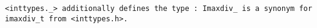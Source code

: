 \tt{<inttypes._>} additionally defines the type :
\tt{Imaxdiv_} is a synonym for \tt{imaxdiv_t} from \tt{<inttypes.h>}.
